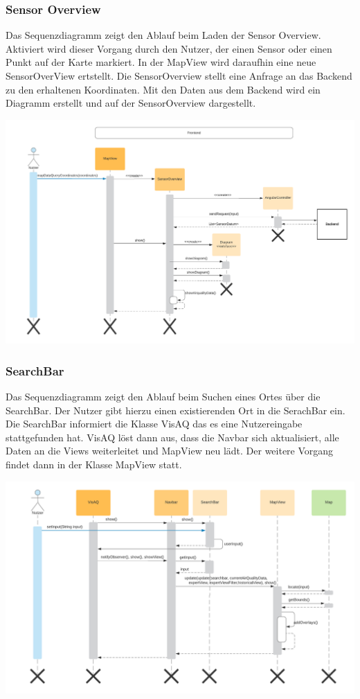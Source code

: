 \subsubsection{Sensor Overview}
\label{Screenshots}
 Das Sequenzdiagramm zeigt den Ablauf beim Laden der Sensor Overview. Aktiviert wird dieser Vorgang durch den Nutzer, der einen Sensor oder einen Punkt auf der Karte markiert. In der MapView wird daraufhin eine neue SensorOverView ertstellt. Die SensorOverview stellt eine Anfrage an das Backend zu den erhaltenen Koordinaten. Mit den Daten aus dem Backend wird ein Diagramm erstellt und auf der SensorOverview dargestellt.
\begin{center}
	\includegraphics[width=1\textwidth]{media/frontend/sequence-diagram/sequenceSensorOverView.png} 
\end{center}

\subsubsection{SearchBar}
\label{Screenshots}
Das Sequenzdiagramm zeigt den Ablauf beim Suchen eines Ortes über die SearchBar. Der Nutzer gibt hierzu einen existierenden Ort in die SerachBar ein. Die SearchBar informiert die Klasse VisAQ das es eine Nutzereingabe stattgefunden hat. VisAQ löst dann aus, dass die Navbar sich aktualisiert, alle Daten an die Views weiterleitet und MapView neu lädt. Der weitere Vorgang findet dann in der Klasse MapView statt.
\begin{center}
	\includegraphics[width=1\textwidth]{media/frontend/sequence-diagram/sequenceSearchbar.png} 
\end{center}

